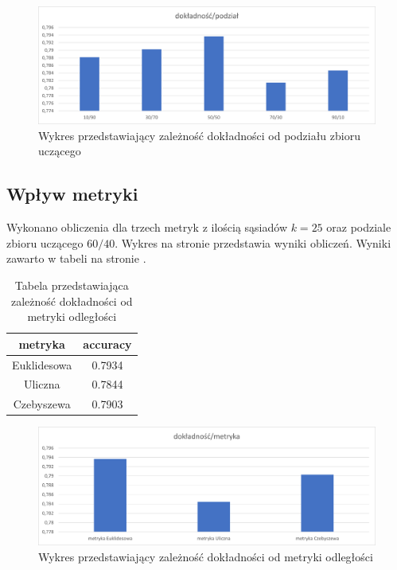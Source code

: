 \documentclass{classrep}
\begin{document}
\begin{figure}
\label{accuracy_div}
\includegraphics[scale=0.75]{accuracy_div}
\caption{Wykres przedstawiający zależność dokładności od podziału zbioru uczącego}
\end{figure}

\subsection{Wpływ metryki}
Wykonano obliczenia dla trzech metryk z ilością sąsiadów $k=25$ oraz podziale zbioru uczącego $60/40$. Wykres na stronie \pageref{accuracy_met} przedstawia wyniki obliczeń. Wyniki zawarto w tabeli na stronie \pageref{tmet}.

\begin{table}
\label{tmet}
\begin{tabular}{|c|c|}
\hline metryka & accuracy \\
\hline \hline
Euklidesowa& 0.7934\\
Uliczna& 0.7844\\
Czebyszewa& 0.7903\\

\end{tabular}
\caption{Tabela przedstawiająca zależność dokładności od metryki odległości}
\end{table}




\begin{figure}
\label{accuracy_met}
\includegraphics[scale=0.75]{accuracy_metric}
\caption{Wykres przedstawiający zależność dokładności od metryki odległości}
\end{figure}
\end{document}
